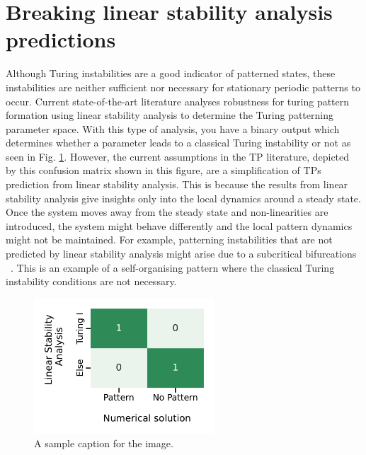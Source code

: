 \section{Breaking linear stability analysis predictions}
Although Turing instabilities are a good indicator of patterned states, these instabilities are neither sufficient nor necessary for stationary periodic patterns to occur.
Current state-of-the-art literature analyses robustness for turing pattern formation using linear stability analysis to determine the Turing patterning parameter space.
With this type of analysis, you have a binary output which determines whether a parameter leads to a classical Turing instability or not as seen in Fig. \ref{fig:lsa_numerical_confusion_literature}.
However, the current assumptions in the TP literature, depicted by this confusion matrix shown in this figure, are a simplification of TPs prediction from linear stability analysis.
This is because the results from linear stability analysis give insights only into the local dynamics around a steady state.
Once the system moves away from the steady state and non-linearities are introduced, the system might behave differently and the local pattern dynamics might not be maintained.
For example, patterning instabilities that are not predicted by linear stability analysis might arise due to a subcritical bifurcations ~\parencite{villar, champneys}.
This is an example of a self-organising pattern where the classical Turing instability conditions are not necessary.


\begin{figure}[H] %
    \centering
    \includegraphics[width=0.6\textwidth]{chapters/Chapter 1/lsa_vs_numerical_confusion_literature} %
    \caption{A sample caption for the image.}
    \label{fig:lsa_numerical_confusion_literature} %
\end{figure}


